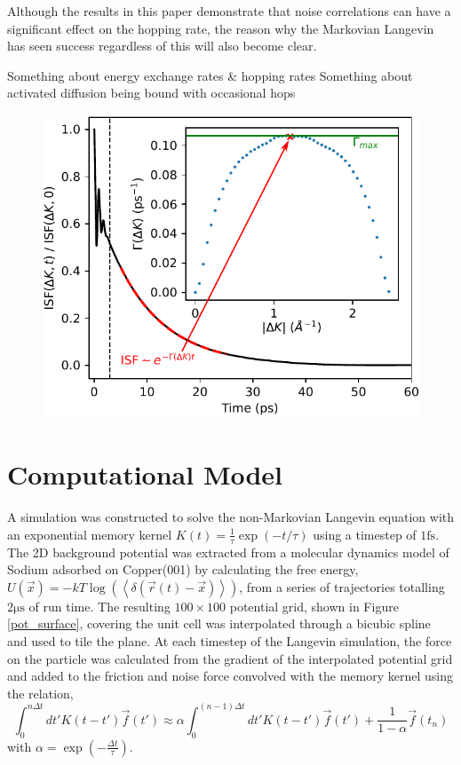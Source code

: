 \documentclass[7pt]{article}
\newcommand{\fs}{\si{\femto\second}}
\newcommand{\us}{\si{\micro\second}}
\begin{document}
Although the results in this paper demonstrate that noise correlations can have a significant effect on the hopping rate, the reason why the Markovian Langevin has seen success regardless of this will also become clear.

Something about energy exchange rates \& hopping rates
Something about activated diffusion being bound with occasional hops

\begin{figure}
	\centering
	\includegraphics{isf_dk}
	\caption{}
	\label{fig:isf_dk}
\end{figure}

\section{Computational Model}

A simulation was constructed to solve the non-Markovian Langevin equation with an exponential memory kernel $K(t)=\frac{1}{\tau}\exp(-t/\tau)$ using a timestep of $1\fs$. The 2D background potential was extracted from a molecular dynamics model of Sodium adsorbed on Copper(001) by calculating the free energy, $U(\vec{x}) = - kT \log(\left< \delta(\vec{r}(t)-\vec{x}) \right>)$, from a series of trajectories totalling $2 \us$ of run time. The resulting $100\times100$ potential grid, shown in Figure \ref{pot_surface},  covering the unit cell was interpolated through a bicubic spline\cite{press1992numerical} and used to tile the plane. At each timestep of the Langevin simulation, the force on the particle was calculated from the gradient of the interpolated potential grid and added to the friction and noise force convolved with the memory kernel using the relation,
$$
\int_0^{n\Delta{t}} dt' K\left(t-t'\right) \vec{f}(t') \approx \alpha \int_0^{(n-1)\Delta{t}} dt' K\left(t-t'\right) \vec{f}(t') + \frac{1}{1-\alpha} \vec{f}\left(t_n\right)
$$
with $\alpha=\exp(-\frac{\Delta{t}}{\tau})$.
\end{document}
